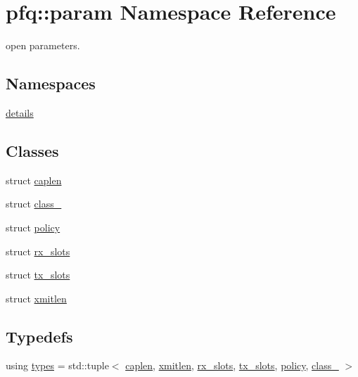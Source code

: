\hypertarget{namespacepfq_1_1param}{}\section{pfq\+:\+:param Namespace Reference}
\label{namespacepfq_1_1param}


open parameters.  


\subsection*{Namespaces}
\begin{DoxyCompactItemize}
\item 
 \hyperlink{namespacepfq_1_1param_1_1details}{details}
\end{DoxyCompactItemize}
\subsection*{Classes}
\begin{DoxyCompactItemize}
\item 
struct \hyperlink{structpfq_1_1param_1_1caplen}{caplen}
\item 
struct \hyperlink{structpfq_1_1param_1_1class__}{class\+\_\+}
\item 
struct \hyperlink{structpfq_1_1param_1_1policy}{policy}
\item 
struct \hyperlink{structpfq_1_1param_1_1rx__slots}{rx\+\_\+slots}
\item 
struct \hyperlink{structpfq_1_1param_1_1tx__slots}{tx\+\_\+slots}
\item 
struct \hyperlink{structpfq_1_1param_1_1xmitlen}{xmitlen}
\end{DoxyCompactItemize}
\subsection*{Typedefs}
\begin{DoxyCompactItemize}
\item 
using \hyperlink{namespacepfq_1_1param_adbf782e10a59b40189d34c425ff8218e}{types} = std\+::tuple$<$ \hyperlink{structpfq_1_1param_1_1caplen}{caplen}, \hyperlink{structpfq_1_1param_1_1xmitlen}{xmitlen}, \hyperlink{structpfq_1_1param_1_1rx__slots}{rx\+\_\+slots}, \hyperlink{structpfq_1_1param_1_1tx__slots}{tx\+\_\+slots}, \hyperlink{structpfq_1_1param_1_1policy}{policy}, \hyperlink{structpfq_1_1param_1_1class__}{class\+\_\+} $>$
\end{DoxyCompactItemize}
